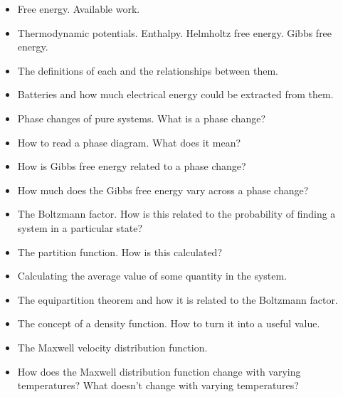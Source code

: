 \vspace{0.2cm}
\begin{itemize}[itemsep=0pt,parsep=0pt,topsep=0pt,partopsep=0pt]
\item Free energy. Available work.
\item Thermodynamic potentials. Enthalpy. Helmholtz free
energy. Gibbs free energy.
\item The definitions of each and the relationships between
them.
\item Batteries and how much electrical energy could be extracted
from them.
\item Phase changes of pure systems. What is a phase change?
\item How to read a phase diagram. What does it mean?
\item How is Gibbs free energy related to a phase change?
\item How much does the Gibbs free energy vary across
a phase change?
\end{itemize}

\vspace{0.2cm}
\begin{itemize}[itemsep=0pt,parsep=0pt,topsep=0pt,partopsep=0pt]
\item The Boltzmann factor. How is this related to the probability
of finding a system in a particular state?
\item The partition function. How is this calculated?
\item Calculating the average value of some quantity in the system.
\item The equipartition theorem and how it is related to the
Boltzmann factor.
\item The concept of a density function. How to turn it into
a useful value.
\item The Maxwell velocity distribution function.
\item How does the Maxwell distribution function change with varying
temperatures? What doesn't change with varying temperatures?
\end{itemize}


